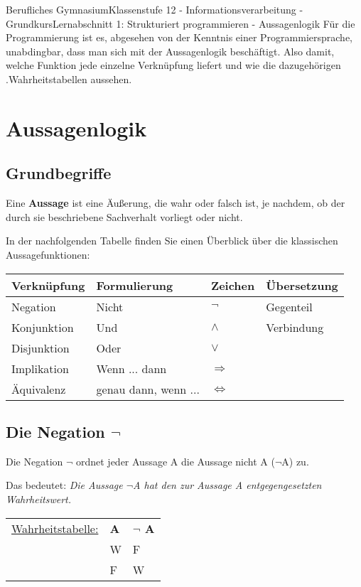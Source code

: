 \documentclass[11pt,oneside,openany,headings=optiontotoc,11pt,numbers=noenddot]{article}
\begin{document}
	\begin{worksheet}{Berufliches Gymnasium}{Klassenstufe 12 - Informationsverarbeitung - Grundkurs}{Lernabschnitt 1: Strukturiert programmieren - Aussagenlogik}
		\noindent
		\setcounter{section}{1}
		\setcounter{page}{3}
		\noindent
		Für die Programmierung ist es, abgesehen von der Kenntnis einer Programmiersprache, unabdingbar, dass man sich mit der Aussagenlogik beschäftigt. Also damit, welche Funktion jede einzelne Verknüpfung liefert und wie die dazugehörigen \grqq.{}Wahrheitstabellen\grqq{} aussehen.
		\section{Aussagenlogik}
		\subsection{Grundbegriffe}
		Eine \textbf{Aussage} ist eine Äußerung, die wahr oder falsch ist, je nachdem, ob der durch sie beschriebene Sachverhalt vorliegt oder nicht.\\
		\par\noindent
		In der nachfolgenden Tabelle finden Sie einen Überblick über die klassischen Aussagefunktionen:\\
		\par\noindent
		\begin{tabularx}{\textwidth}{|X|X|X|X|}
			\hline
			\rowcolor{gray!10} \textbf{Verknüpfung} & \textbf{Formulierung} & \textbf{Zeichen} & \textbf{\glqq{}Übersetzung\grqq{}}\\
			\hline
			Negation & Nicht & \(\neg\) & Gegenteil\\
			\hline
			Konjunktion & Und & \(\wedge\) & Verbindung\\
			\hline
			Disjunktion & Oder & \(\vee\) & \\
			\hline
			Implikation & Wenn ... dann & \(\Rightarrow\) & \\
			\hline
			Äquivalenz & genau dann, wenn ... & \(\Leftrightarrow\) & \\
			\hline
		\end{tabularx}
		\subsection{Die Negation \grqq{}\(\neg\)\grqq{}}
		Die Negation \grqq{}$\neg$\grqq{} ordnet jeder Aussage A die Aussage \grqq{}nicht A\grqq{} ($\neg$A) zu.
		\begin{framed}
			\noindent
			Das bedeutet: \textit{Die Aussage $\neg$A hat den zur Aussage A entgegengesetzten Wahrheitswert.}
		\end{framed}
		\par\noindent
		\begin{tabularx}{\textwidth}{l|l|l|}
			\cline{2-3}
			\underline{Wahrheitstabelle:} & \textbf{A} & \textbf{$\mathbf{\neg}$ A}\\
			\cline{2-3}
			& W & F\\
			\cline{2-3}
			& F & W\\
			\cline{2-3}
		\end{tabularx}

\end{worksheet}
\end{document}
